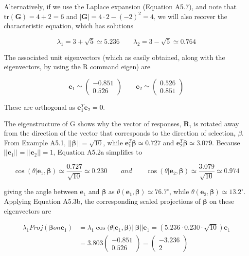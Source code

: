 \documentclass{article}
\begin{document}
Alternatively, if we use the Laplace expansion (Equation A5.7), and note that  $ \mathrm{tr}(\mathbf{G}) = 4 + 2 = 6 $ and  $ |\mathbf{G}| = 4 \cdot 2 - (-2)^2 = 4 $, we will also recover the characteristic equation, which has solutions

\begin{equation}
\lambda_{1}=3+\sqrt{5}\simeq5.236\qquad\lambda_{2}=3-\sqrt{5}\simeq0.764
\end{equation}

The associated unit eigenvectors (which as easily obtained, along with the eigenvectors, by using the R command eigen) are

\begin{equation}
\mathbf{e}_{1}\simeq\begin{pmatrix}-0.851\\ 0.526\end{pmatrix}\qquad\mathbf{e}_{2}\simeq\begin{pmatrix}0.526\\ 0.851\end{pmatrix}
\end{equation}

These are orthogonal as  $ \mathbf{e}_{1}^{T}\mathbf{e}_{2}=0 $.

The eigenstructure of G shows why the vector of responses,  $ \mathbf{R} $, is rotated away from the direction of the vector that corresponds to the direction of selection,  $ \beta $. From Example A5.1,  $ ||\boldsymbol{\beta}|| = \sqrt{10} $, while  $ \mathbf{e}_1^T \boldsymbol{\beta} \simeq 0.727 $ and  $ \mathbf{e}_2^T \boldsymbol{\beta} \simeq 3.079 $. Because  $ ||\mathbf{e}_1|| = ||\mathbf{e}_2|| = 1 $, Equation A5.2a simplifies to

\begin{equation}
\cos(\theta|\mathbf{e}_{1},\boldsymbol{\beta})\simeq\frac{0.727}{\sqrt{10}}\simeq0.230\qquad and\qquad\cos(\theta|\mathbf{e}_{2},\boldsymbol{\beta})\simeq\frac{3.079}{\sqrt{10}}\simeq0.974
\end{equation}

giving the angle between $\mathbf{e}_1$ and $\boldsymbol{\beta}$ as $\theta(\mathbf{e}_1, \boldsymbol{\beta}) \simeq 76.7^\circ$, while $\theta(\mathbf{e}_2, \boldsymbol{\beta}) \simeq 13.2^\circ$. Applying Equation A5.3b, the corresponding scaled projections of $\boldsymbol{\beta}$ on these eigenvectors are

\begin{equation}
\begin{aligned}\lambda_{1}Proj(\boldsymbol{\beta}on\mathbf{e}_{1})&=\lambda_{1}\cos(\theta|\mathbf{e}_{1},\boldsymbol{\beta})||\boldsymbol{\beta}||\mathbf{e}_{1}=\left(5.236\cdot0.230\cdot\sqrt{10}\right)\mathbf{e}_{1}\\&=3.803\left(\begin{array}{c}-0.851\\0.526\end{array}\right)=\left(\begin{array}{c}-3.236\\2\end{array}\right)\end{aligned}
\end{equation}
\end{document}
